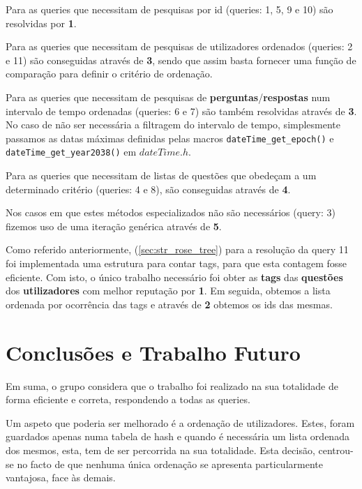 \documentclass[10pt,a4paper]{article}
\begin{document}
    Para as queries que necessitam de pesquisas por id (queries: 1, 5, 9 e 10)
    são resolvidas por \textbf{1}.

    Para as queries que necessitam de pesquisas de utilizadores ordenados
    (queries: 2 e 11) são conseguidas através de \textbf{3}, sendo que assim
    basta fornecer uma função de comparação para definir o critério de ordenação.

    Para as queries que necessitam de pesquisas de
    \textbf{perguntas}/\textbf{respostas} num intervalo de tempo ordenadas
    (queries: 6 e 7) são também resolvidas através de \textbf{3}. No caso de não
    ser necessária a filtragem do intervalo de tempo, simplesmente passamos as
    datas máximas definidas pelas macros \texttt{dateTime_get_epoch()} e
    \texttt{dateTime_get_year2038()} em $dateTime.h$.

    Para as queries que necessitam de listas de questões que obedeçam a um
    determinado critério (queries: 4 e 8), são conseguidas através de \textbf{4}.

    Nos casos em que estes métodos especializados não são necessários (query: 3)
    fizemos uso de uma iteração genérica através de \textbf{5}.

    Como referido anteriormente, (\ref{sec:str_rose_tree}) para a resolução da
    query 11 foi implementada uma estrutura para contar tags, para que esta
    contagem fosse eficiente. Com isto, o único trabalho necessário foi obter as
    \textbf{tags} das \textbf{questões} dos \textbf{utilizadores} com melhor
    reputação por \textbf{1}. Em seguida, obtemos a lista ordenada por ocorrência
    das tags e através de \textbf{2} obtemos os ids das mesmas.

\section{Conclusões e Trabalho Futuro}
    Em suma, o grupo considera que o trabalho foi realizado na sua
    totalidade de forma eficiente e correta, respondendo a todas as queries.

    Um aspeto que poderia ser melhorado é a ordenação de utilizadores. Estes,
    foram guardados apenas numa tabela de hash e quando é necessária um lista
    ordenada dos mesmos, esta, tem de ser percorrida na sua totalidade. Esta
    decisão, centrou-se no facto de que nenhuma única ordenação se apresenta
    particularmente vantajosa, face às demais.
\end{document}
